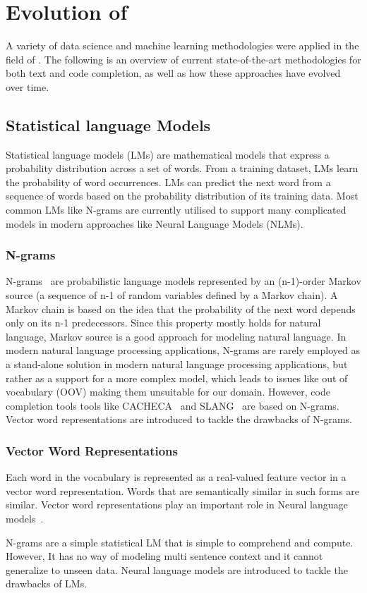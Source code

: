\section{Evolution of \cct{}}
A variety of data science and machine learning methodologies were applied in the field of \cct{}. The following is an overview of current state-of-the-art methodologies for both text and code completion, as well as how these approaches have evolved over time.

\subsection{Statistical language Models}
Statistical language models (LMs) are mathematical models that express a probability distribution across a set of words. From a training dataset, LMs learn the probability of word occurrences. LMs can predict the next word from a sequence of words based on the probability distribution of its training data. Most common LMs like N-grams are currently utilised to support many complicated models in modern approaches like Neural Language Models (NLMs).

\subsubsection{N-grams}
N-grams~\cite{ngram} are probabilistic language models represented by an (n-1)-order Markov source (a sequence of n-1 of random variables defined by a Markov chain). A Markov chain is based on the idea that the probability of the next word depends only on its n-1 predecessors. Since this property mostly holds for natural language, Markov source is a good approach for modeling natural language. In modern natural language processing applications, N-grams are rarely employed as a stand-alone solution in modern natural language processing applications, but rather as a support for a more complex model, which leads to issues like out of vocabulary (OOV) making them unsuitable for our domain. However, code completion tools tools like CACHECA~\cite{cacheca} and SLANG~\cite{slang} are based on N-grams. Vector word representations are introduced to tackle the drawbacks of N-grams.

\subsubsection{Vector Word Representations}
Each word in the vocabulary is represented as a real-valued feature vector in a vector word representation. Words that are semantically similar in such forms are similar. Vector word representations play an important role in Neural language models~\cite{mnlm}.
 
N-grams are a simple statistical LM that is simple to comprehend and compute. However, It has no way of modeling multi sentence context and it cannot generalize to unseen data. Neural language models are introduced to tackle the drawbacks of LMs.